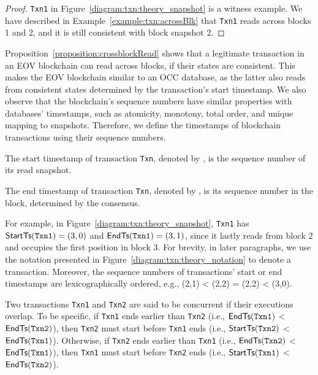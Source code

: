 {\begin{proof}
  \texttt{Txn1} in Figure~\ref{diagram:txn:theory_snapshot} is a witness example.
  We have described in Example~\ref{example:txn:acrossBlk} that \texttt{Txn1} reads across
  blocks 1 and 2, and it is still consistent with block snapshot 2.
\end{proof}

Proposition~\ref{proposition:crossblockRead} shows that a legitimate transaction in an
EOV blockchain can read across blocks, if their states are consistent.
%
This makes the EOV blockchain similar to an OCC database, as the
latter also reads from consistent states determined by the transaction's start
timestamp.
%
We also observe that the blockchain's sequence numbers have similar properties with
databases' timestamps, such as atomicity, monotony, total order, and
unique mapping to snapshots.
%
Therefore, we define the timestamps of blockchain transactions using their
sequence numbers.

\begin{definition}
  \label{defn:start-timestamp}
  The start timestamp of transaction \texttt{Txn}, denoted by , is
  the sequence number of its read snapshot.
\end{definition}

\begin{definition}
  \label{defn:commit-timestamp}
  The end timestamp of transaction \texttt{Txn}, denoted by , is its sequence number in the block, determined by the consensus. 
\end{definition}

For example, in Figure~\ref{diagram:txn:theory_snapshot}, \texttt{Txn1} has $\textsf{StartTs}(\texttt{Txn1}) =
(3, 0)$ and $\textsf{EndTs}(\texttt{Txn1}) = (3,1)$, since it lastly reads from block $2$ and
occupies the first position in block $3$.
%
For brevity, in later paragraphs, we use the notation presented in
Figure~\ref{diagram:txn:theory_notation} to denote a transaction.
%
Moreover, the sequence numbers of transactions' start or end timestamps are lexicographically ordered, e.g., (2,1) < (2,2) = (2,2) < (3,0).

\begin{definition}
  \label{defn:concurrent-transaction}
  Two transactions \texttt{Txn1} and \texttt{Txn2} are said to be concurrent if their executions overlap. 
  To be specific, if \texttt{Txn1} ends earlier than \texttt{Txn2} (i.e., $\textsf{EndTs}(\texttt{Txn1})$ < $\textsf{EndTs}(\texttt{Txn2})$), then \texttt{Txn2} must start before \texttt{Txn1} ends (i.e., $\textsf{StartTs}(\texttt{Txn2})$ < $\textsf{EndTs}(\texttt{Txn1})$). Otherwise, if \texttt{Txn2} ends earlier than \texttt{Txn1} (i.e., $\textsf{EndTs}(\texttt{Txn2})$ < $\textsf{EndTs}(\texttt{Txn1})$), then \texttt{Txn1} must start before \texttt{Txn2} ends (i.e., $\textsf{StartTs}(\texttt{Txn1})$ < $\textsf{EndTs}(\texttt{Txn2})$).
\end{definition}

}
